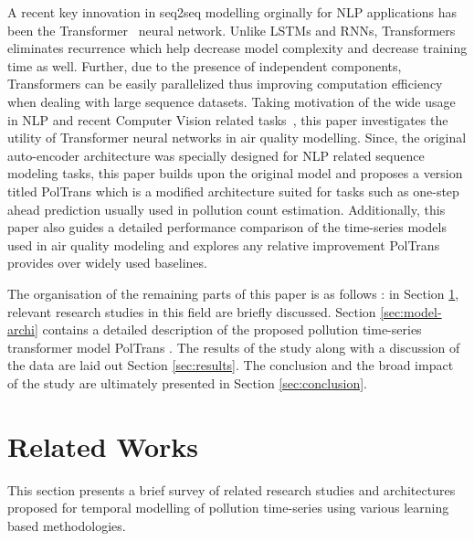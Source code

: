 \documentclass[10pt,journal]{IEEEtran}
\begin{document}
A recent key innovation in seq2seq modelling orginally for NLP applications has been the Transformer~\cite{Vaswani.2017} neural network. Unlike LSTMs and RNNs, Transformers eliminates recurrence which help decrease model complexity and decrease training time as well. Further, due to the presence of independent components, Transformers can be easily parallelized thus improving computation efficiency when dealing with large sequence datasets.  Taking motivation of the wide usage in NLP and recent Computer Vision related tasks~\cite{Parmer.2018}, this paper investigates the utility of Transformer neural networks in air quality modelling. Since, the original  auto-encoder architecture was specially designed for NLP related sequence modeling tasks, this paper builds upon the original model and proposes a version titled {PolTrans}  which is a modified architecture suited for tasks such as one-step ahead prediction usually used in pollution count estimation. Additionally, this paper also guides a detailed performance comparison of the time-series models used in air quality modeling and explores any relative improvement {PolTrans}  provides over widely used baselines.

The organisation of the remaining parts of this paper is as follows : in Section \ref{sec:related-works}, relevant research studies in this field are briefly discussed. Section \ref{sec:model-archi} contains a detailed description of the proposed pollution time-series transformer model {PolTrans} . The results of the study along with a discussion of the data are laid out Section \ref{sec:results}. The conclusion and the broad impact of the study are ultimately presented in Section \ref{sec:conclusion}.

\section{Related Works}
\label{sec:related-works}

This section presents a brief survey of related research studies and architectures proposed for temporal modelling of pollution time-series using various learning based methodologies.
\end{document}
